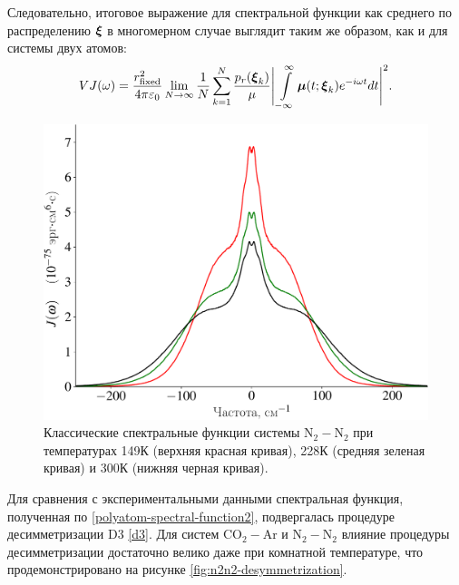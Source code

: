 Следовательно, итоговое выражение для спектральной функции как среднего по распределению $\boldsymbol{\xi}$ в многомерном случае выглядит таким же образом, как и для системы двух атомов:
\begin{gather}
    V J(\omega) = \frac{r_\text{fixed}^2}{4 \pi \varepsilon_0} \lim_{N \rightarrow \infty} \frac{1}{N} \sum_{k = 1}^N \frac{p_r(\boldsymbol{\xi}_k)}{\mu} \Bigg\vert \int\limits_{-\infty}^\infty \boldsymbol{\mu}(t; \boldsymbol{\xi}_k) e^{-i \omega t} dt \Bigg\vert^2. \label{polyatom-spectral-function2}
\end{gather}

\setcounter{figure}{10}
\begin{figure}[H]
    \centering
    \includegraphics[width=0.7\linewidth]{./pictures/polyatom_spectra/n2n2_spectral_functions-crop.pdf}
    \caption{Классические спектральные функции системы N$_2-$N$_2$ при температурах 149К (верхняя красная кривая), 228К (средняя зеленая кривая) и 300К (нижняя черная кривая).}
    \label{fig:n2n2-spectral-functions}
\end{figure}

Для сравнения с экспериментальными данными спектральная функция, полученная по \eqref{polyatom-spectral-function2},  подвергалась процедуре десимметризации D3 \eqref{d3}. Для систем CO$_2-$Ar и N$_2-$N$_2$ влияние процедуры десимметризации достаточно велико даже при комнатной температуре, что продемонстрировано на рисунке \ref{fig:n2n2-desymmetrization}. 

